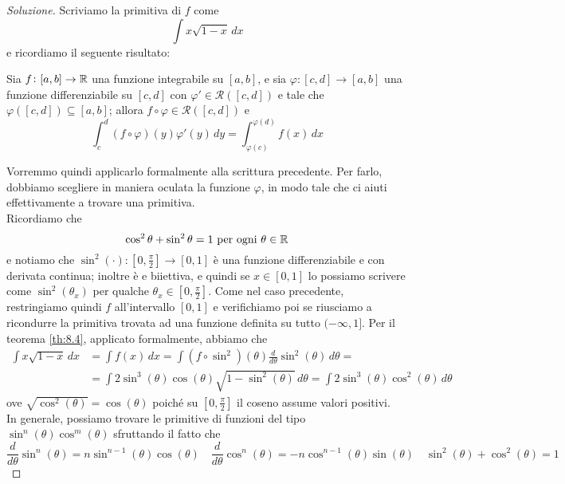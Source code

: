 \begin{proof}[Soluzione]
    Scriviamo la primitiva di $f$ come
    \[
    \int x\sqrt{1-x}\, dx
    \]
    e ricordiamo il seguente risultato:
    \begin{tcolorbox}
        \begin{theorem}
            \label{th:8.4}
            Sia $f\colon[a,b]\to\amsbb{R}$ una funzione integrabile su $[a,b]$, e sia $\varphi\colon [c,d]\to [a,b]$ una funzione differenziabile su $[c,d]$ con $\varphi'\in\mathscr{R}([c,d])$ e tale che $\varphi([c,d])\subseteq [a,b]$; allora $f\circ \varphi\in\mathscr{R}([c,d])$ e
            \[
            \int_c^d (f\circ \varphi)(y) \varphi'(y)\, dy = \int_{\varphi(c)}^{\varphi(d)} f(x)\, dx
            \]
        \end{theorem}
    \end{tcolorbox}
    Vorremmo quindi applicarlo formalmente alla scrittura precedente. Per farlo, dobbiamo scegliere in maniera oculata la funzione $\varphi$, in modo tale che ci aiuti effettivamente a trovare una primitiva.\\
    Ricordiamo che
    \[
    \cos^2\theta + \sin^2 \theta = 1 \ \text{per ogni} \ \theta\in\amsbb{R}
    \]
    e notiamo che $\sin^2(\cdot)\colon \left[0, \frac{\pi}{2}\right]\to [0,1]$ è una funzione differenziabile e con derivata continua; inoltre è e biiettiva, e quindi se $x\in[0,1]$ lo possiamo scrivere come $\sin^2(\theta_x)$ per qualche $\theta_x\in\left[0, \frac{\pi}{2}\right]$. 
    Come nel caso precedente, restringiamo quindi $f$ all'intervallo $[0,1]$ e verifichiamo poi se riusciamo a ricondurre la primitiva trovata ad una funzione definita su tutto $(-\infty, 1]$.
    Per il teorema \ref{th:8.4}, applicato formalmente, abbiamo che
    \[
    \begin{split}
        \int x\sqrt{1-x}\, dx & = \int f(x)\, dx = \int (f\circ \sin^2)(\theta) \frac{d}{d\theta}\sin^2(\theta)\, d\theta = \\
        & = \int 2\sin^3(\theta)\cos(\theta)\sqrt{1-\sin^2(\theta)}\, d\theta = \int 2\sin^3(\theta)\cos^2(\theta)\, d\theta
    \end{split}
    \]
    ove $\sqrt{\cos^2(\theta)} = \cos(\theta)$ poiché su $\left[0, \frac{\pi}{2}\right]$ il coseno assume valori positivi.\\
    In generale, possiamo trovare le primitive di funzioni del tipo $\sin^n(\theta)\cos^m(\theta)$ sfruttando il fatto che
    \[
    \frac{d}{d\theta}\sin^n(\theta) = n\sin^{n-1}(\theta)\cos(\theta) \quad \frac{d}{d\theta}\cos^n(\theta) = -n\cos^{n-1}(\theta)\sin(\theta) \quad \sin^2(\theta) + \cos^2(\theta) = 1
\]
\end{proof}
